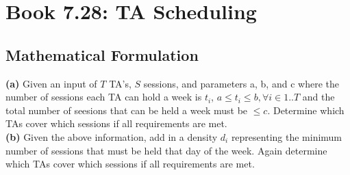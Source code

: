 \documentclass[12pt]{article}
\begin{document}

\newcommand{\hmwkClass}{COS 255}
\newcommand{\hmwkSemester}{Spring 2016}

\newcommand{\hmwkAuthorName}{Lukas Leung}
\newcommand{\hmwkAuthorID}{lleung}

\newcommand{\hmwkAssignmentNum}{7}

\newcommand{\hmwkProblemNum}{2}

\newcommand{\hmwkCollaborators}{}
\thispagestyle{fancycollab}


\section{Book 7.28: TA Scheduling}

\subsection{Mathematical Formulation}
\textbf{(a)} Given an input of $T$ TA's, $S$ sessions, and parameters a, b, and c where the number of sessions each TA
can hold a week is $t_i$, $a \leq t_i \leq b, \forall i \in 1..T$ and the total number of seesions that can
be held a week must be $\leq c$. Determine which TAs cover which sessions if all requirements are met. \\

\noindent \textbf{(b)} Given the above information, add in a density $d_i$ representing the minimum number of sessions that must be
held that day of the week. Again determine which TAs cover which sessions if all requirements are met.

\end{document}
